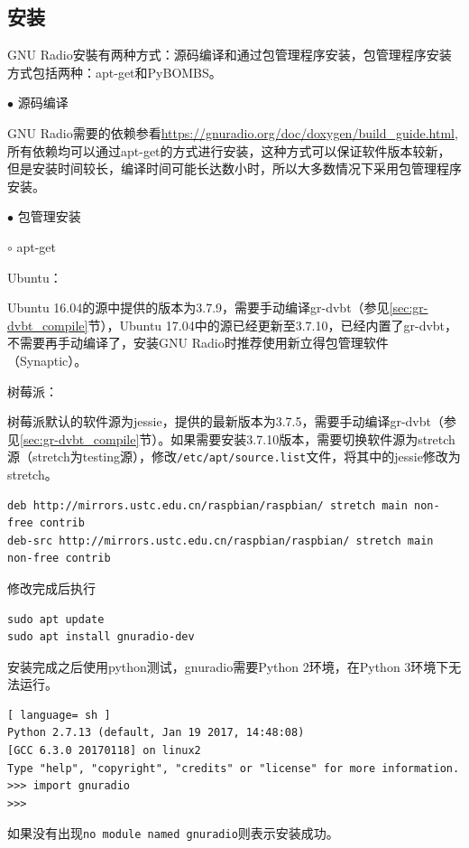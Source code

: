 		\subsection{安装}
			\par GNU Radio安裝有两种方式：源码编译和通过包管理程序安装，包管理程序安装方式包括两种：apt-get和PyBOMBS。
			\par\noindent $\bullet$ 源码编译
			\par GNU Radio需要的依赖参看\href{https://gnuradio.org/doc/doxygen/build\_guide.html}{https://gnuradio.org/doc/doxygen/build\_guide.html},所有依赖均可以通过apt-get的方式进行安装，这种方式可以保证软件版本较新，但是安装时间较长，编译时间可能长达数小时，所以大多数情况下采用包管理程序安装。
			\par\noindent $\bullet$ 包管理安装
			\par\noindent \qquad$\circ$ apt-get
			\par Ubuntu：
			\par Ubuntu 16.04的源中提供的版本为3.7.9，需要手动编译gr-dvbt（参见\ref{sec:gr-dvbt_compile}节），Ubuntu 17.04中的源已经更新至3.7.10，已经内置了gr-dvbt，不需要再手动编译了，安装GNU Radio时推荐使用新立得包管理软件（Synaptic）。
			\par 树莓派：
			\par 树莓派默认的软件源为jessie，提供的最新版本为3.7.5，需要手动编译gr-dvbt（参见\ref{sec:gr-dvbt_compile}节）。如果需要安装3.7.10版本，需要切换软件源为stretch源（stretch为testing源），修改\lstinline[language=sh]{/etc/apt/source.list}文件，将其中的jessie修改为stretch。
			\begin{lstlisting}
deb http://mirrors.ustc.edu.cn/raspbian/raspbian/ stretch main non-free contrib 
deb-src http://mirrors.ustc.edu.cn/raspbian/raspbian/ stretch main non-free contrib
			\end{lstlisting}
			\par 修改完成后执行
			\begin{lstlisting}
sudo apt update
sudo apt install gnuradio-dev
			\end{lstlisting}
			\par 安装完成之后使用python测试，gnuradio需要Python 2环境，在Python 3环境下无法运行。
			\begin{lstlisting}[ language= sh ]
Python 2.7.13 (default, Jan 19 2017, 14:48:08)
[GCC 6.3.0 20170118] on linux2
Type "help", "copyright", "credits" or "license" for more information.
>>> import gnuradio
>>>
			\end{lstlisting}
			\par 如果没有出现\lstinline[language=sh]{no module named gnuradio}则表示安装成功。

